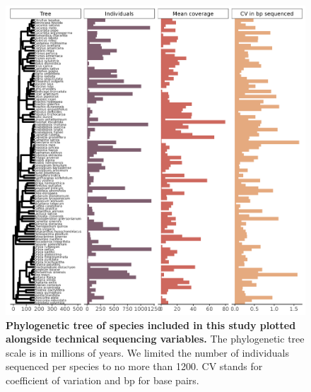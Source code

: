 \documentclass[12pt]{article}
\begin{document}
\begin{figure}[H]
    \centering
    \includegraphics[width=\textwidth]{figures/appendix_d/tree_with_technical_variables_2024-12-12.jpg}
    \caption{\textbf{Phylogenetic tree of species included in this study plotted alongside technical sequencing variables.} The phylogenetic tree scale is in millions of years. We limited the number of individuals sequenced per species to no more than 1200. CV stands for coefficient of variation and bp for base pairs.}
\end{figure}
\end{document}
